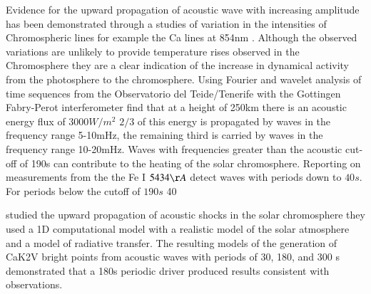 \documentclass{aa}
\begin{document}
Evidence for the upward propagation of acoustic wave with increasing amplitude has been demonstrated through a studies of variation in the intensities of Chromospheric lines for example the Ca lines at 854nm \cite{Beck2012}. Although the observed variations are unlikely to provide temperature rises observed in the Chromosphere they are a clear indication of the increase in dynamical activity from the photosphere to the chromosphere. Using Fourier and wavelet analysis of time sequences from the Observatorio del Teide/Tenerife with the Gottingen Fabry-Perot interferometer \cite{Bello2009} find that at a height of 250km there is an acoustic energy flux of $3000W/m^2$  $2/3$ of this energy is propagated by waves in the frequency range 5-10mHz, the remaining third is carried by waves in the frequency range 10-20mHz. Waves with frequencies greater than the acoustic cut-off of 190s can contribute to the heating of the solar chromosphere. Reporting on measurements from the the Fe I $5434{\AA}$ \cite{Bello2010A} detect waves with periods down to $40s$. For periods below the cutoff of $190s$ 40%

  \cite{Carlsson1992} studied the upward propagation of acoustic shocks in the solar chromosphere they used a 1D computational model with a realistic model of the solar atmosphere and a model of radiative transfer. The resulting models of the generation of CaK2V bright points from acoustic waves with periods of 30, 180, and 300 s demonstrated that a 180s periodic driver produced results consistent with observations. 
\end{document}
